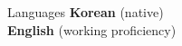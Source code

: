 \begin{rSection}{Languages}
  \textbf{Korean} (native) \\
  \textbf{English} (working proficiency)
\end{rSection}
